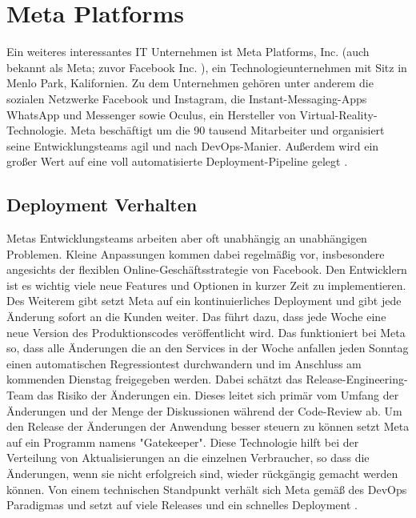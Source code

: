 \section{Meta Platforms}

Ein weiteres interessantes IT Unternehmen ist Meta Platforms, Inc. (auch bekannt als Meta; zuvor Facebook Inc. \cite{Petereit}), ein Technologieunternehmen mit Sitz in Menlo Park, Kalifornien. Zu dem Unternehmen gehören unter anderem die sozialen Netzwerke Facebook und Instagram, die Instant-Messaging-Apps WhatsApp und Messenger sowie Oculus, ein Hersteller von Virtual-Reality-Technologie. Meta beschäftigt um die 90 tausend Mitarbeiter und organisiert seine Entwicklungsteams agil und nach DevOps-Manier. Außerdem wird ein großer Wert auf eine voll automatisierte Deployment-Pipeline gelegt \cite{Team}.

\subsection{Deployment Verhalten}
Metas Entwicklungsteams arbeiten aber oft unabhängig an unabhängigen Problemen. Kleine Anpassungen kommen dabei regelmäßig vor, insbesondere angesichts der flexiblen Online-Geschäftsstrategie von Facebook. Den Entwicklern ist es wichtig viele neue Features und Optionen in kurzer Zeit zu implementieren. Des Weiterem gibt setzt Meta auf ein kontinuierliches Deployment und gibt jede Änderung sofort an die Kunden weiter. Das führt dazu, dass jede Woche eine neue Version des Produktionscodes veröffentlicht wird. Das funktioniert bei Meta so, dass alle Änderungen die an den Services in der Woche anfallen jeden Sonntag einen automatischen Regressiontest durchwandern und im Anschluss am kommenden Dienstag freigegeben werden. Dabei schätzt das Release-Engineering-Team das Risiko der Änderungen ein. Dieses leitet sich primär vom Umfang der Änderungen und der Menge der Diskussionen während der Code-Review ab. Um den Release der Änderungen der Anwendung besser steuern zu können setzt Meta auf ein Programm namens "Gatekeeper". Diese Technologie hilft bei der Verteilung von Aktualisierungen an die einzelnen Verbraucher, so dass die Änderungen, wenn sie nicht erfolgreich sind, wieder rückgängig gemacht werden können. Von einem technischen Standpunkt verhält sich Meta gemäß des DevOps Paradigmas und setzt auf viele Releases und ein schnelles Deployment \cite{jameslee}.

